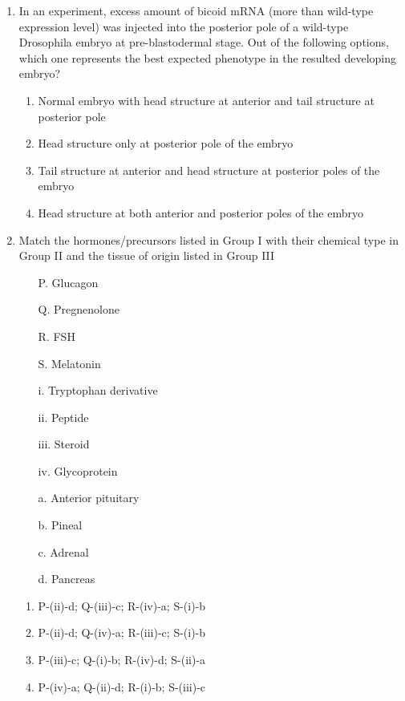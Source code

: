 \documentclass[journal,12pt,onecolumn]{IEEEtran}
\begin{document}
\begin{enumerate}
    \item In an experiment, excess amount of bicoid mRNA (more than wild-type expression level) was injected into the posterior pole of a wild-type Drosophila embryo at pre-blastodermal stage. Out of the following options, which one represents the best expected phenotype in the resulted developing embryo?
    \begin{enumerate}
        \item Normal embryo with head structure at anterior and tail structure at posterior pole
        \item Head structure only at posterior pole of the embryo
        \item Tail structure at anterior and head structure at posterior poles of the embryo
        \item Head structure at both anterior and posterior poles of the embryo
    \end{enumerate}

    \item \begin{minipage}{0.45\textwidth}
    Match the hormones/precursors listed in Group I with their chemical type in Group II and the tissue of origin listed in Group III
    \begin{itemize}
        \item[P.] Glucagon
        \item[Q.] Pregnenolone
        \item[R.] FSH
        \item[S.] Melatonin
    \end{itemize}
    \end{minipage}
    \begin{minipage}{0.45\textwidth}
    \begin{itemize}
        \item[i.] Tryptophan derivative
        \item[ii.] Peptide
        \item[iii.] Steroid
        \item[iv.] Glycoprotein
        \item[a.] Anterior pituitary
        \item[b.] Pineal
        \item[c.] Adrenal
        \item[d.] Pancreas
    \end{itemize}
    \end{minipage}
    \begin{enumerate}
        \item P-(ii)-d; Q-(iii)-c; R-(iv)-a; S-(i)-b
        \item P-(ii)-d; Q-(iv)-a; R-(iii)-c; S-(i)-b
        \item P-(iii)-c; Q-(i)-b; R-(iv)-d; S-(ii)-a
        \item P-(iv)-a; Q-(ii)-d; R-(i)-b; S-(iii)-c
    \end{enumerate}


\end{enumerate}
\end{document}
